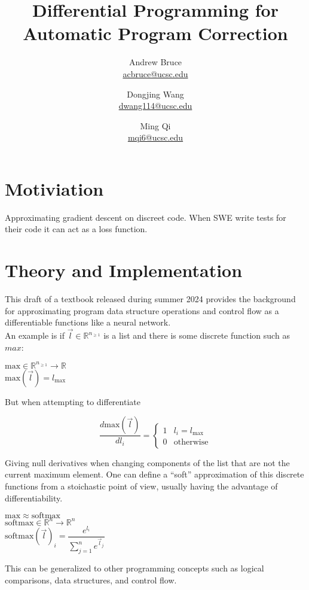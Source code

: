 \documentclass{article}
\title{Differential Programming for Automatic Program Correction}
\author{Andrew Bruce \\ \href{mailto:acbruce@ucsc.edu}{acbruce@ucsc.edu}
  \and Dongjing Wang \\ \href{mailto:dwang114@ucsc.edu}{dwang114@ucsc.edu}
  \and Ming Qi \\ \href{mailto:mqi6@ucsc.edu}{mqi6@ucsc.edu} }
\begin{document}
\maketitle
\section*{Motiviation}
Approximating gradient descent on discreet code. When SWE write tests for their code it can act as a loss function.

\section*{Theory and Implementation}
This draft of a textbook \cite{blondel2024elementsdifferentiableprogramming} released during summer 2024 provides the background for approximating program data structure operations and control flow as a differentiable functions like a neural network.\\
An example is if $\vec{l} \in \mathbb{R}^{n_{\ge 1}}$ is a list and there is some discrete function such as $max$:
\begin{center}
  $\mathrm{max} \in \mathbb{R}^{n_{\ge 1}} \rightarrow \mathbb{R}$\\
  $\mathrm{max}(\vec{l}) = l_{\mathrm{max}}$
\end{center}
But when attempting to differentiate
\begin{center}
  $$\dfrac{d \mathrm{max}(\vec{l})}{dl_i} = \left\{
  \begin{array}{ll}
    1 & l_i = l_{\mathrm{max}} \\
    0 & \mathrm{otherwise}
  \end{array} 
  \right.$$
\end{center}
Giving null derivatives when changing components of the list that are not the current maximum element.
One can define a ``soft'' approximation of this discrete functions from a stoichastic point of view, usually having the advantage of differentiability.
\begin{center}
  $\mathrm{max} \approx \mathrm{softmax}$\\
  $\mathrm{softmax} \in \mathbb{R}^n \rightarrow \mathbb{R}^n$\\
  $\mathrm{softmax}(\vec{l})_i = \dfrac{e^{l_i}}{\sum_{j=1}^n e^{\vec{l}_j}}$\\
\end{center}
This can be generalized to other programming concepts such as logical comparisons, data structures, and control flow.
\end{document}
